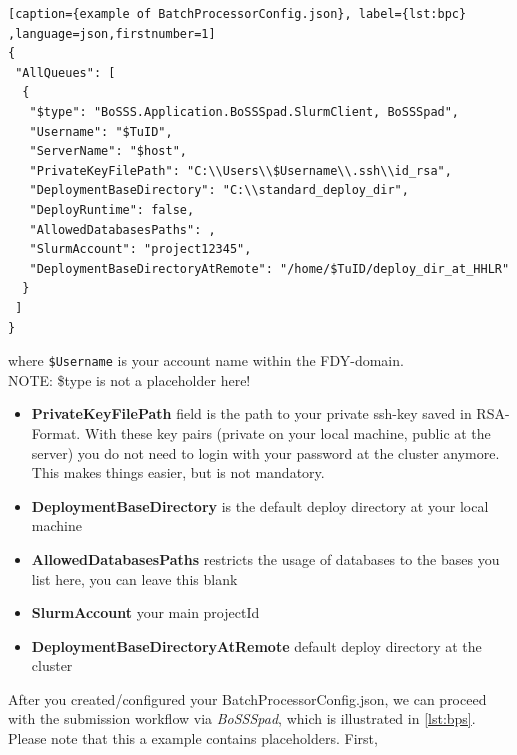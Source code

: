 \documentclass[11pt,twoside,a4paper]{fdyartcl}
\begin{document}
\noindent
\begin{minipage}{\linewidth}
\begin{lstlisting}[caption={example of BatchProcessorConfig.json}, label={lst:bpc} ,language=json,firstnumber=1]
{
 "AllQueues": [
  {
   "$type": "BoSSS.Application.BoSSSpad.SlurmClient, BoSSSpad",
   "Username": "$TuID",
   "ServerName": "$host",
   "PrivateKeyFilePath": "C:\\Users\\$Username\\.ssh\\id_rsa",
   "DeploymentBaseDirectory": "C:\\standard_deploy_dir",
   "DeployRuntime": false,
   "AllowedDatabasesPaths": ,
   "SlurmAccount": "project12345",
   "DeploymentBaseDirectoryAtRemote": "/home/$TuID/deploy_dir_at_HHLR"
  }
 ]
}
\end{lstlisting}
\end{minipage}
where \verb|$Username| is your account name within the FDY-domain.\\
NOTE: \$type is not a placeholder here!
\begin{itemize}
	\item[] \textbf{PrivateKeyFilePath} field is the path to your private ssh-key saved in RSA-Format.
	With these key pairs (private on your local machine, public at the server) you do not need to login with your password at the cluster anymore.
	This makes things easier, but is not mandatory. 
	\item[] \textbf{DeploymentBaseDirectory} is the default deploy directory at your local machine
	\item[] \textbf{AllowedDatabasesPaths} restricts the usage of databases to the bases you list here, you can leave this blank
	\item[] \textbf{SlurmAccount} your main projectId
	\item[] \textbf{DeploymentBaseDirectoryAtRemote} default deploy directory at the cluster
\end{itemize}

After you created/configured your BatchProcessorConfig.json, we can proceed with the submission workflow via \emph{BoSSSpad},
which is illustrated in \ref{lst:bps}. 
Please note that this a example contains placeholders. First, 

\noindent
\begin{minipage}{\linewidth}
	\begin{lstlisting}[caption={example of Job Submission via BoSSSpad}, label={lst:bps}]
	\end{lstlisting}
	\renewcommand{\BoSSSbwsName}{UsingSlurmClient}
	
\end{minipage}
\end{document}
